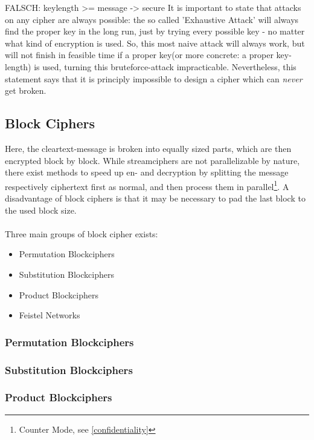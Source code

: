 FALSCH: keylength >= message -> secure
It is important to state that attacks on any cipher are always possible: the so called
'Exhaustive Attack' will always find the proper key in the long run, just by trying every
possible key - no matter what kind of encryption is used. So, this most naive attack will always work, but
will not finish in feasible time if a proper key(or more concrete: a proper key-length) is used, turning this bruteforce-attack
impracticable. Nevertheless, this statement says that it is principly impossible to design
a cipher which can \textit{never} get broken.

\subsection{Block Ciphers}

Here, the cleartext-message is broken into equally sized parts, which are then encrypted block by block. While streamciphers are not parallelizable
by nature, there exist methods to speed up en- and decryption by splitting the message respectively ciphertext first as normal, and then process them in
parallel\footnote{Counter Mode, see \ref{confidentiality}}. A disadvantage of block ciphers is that it may be necessary to pad the last block to the used block size. 
\\
\\
Three main groups of block cipher exists:
\begin{itemize}
 \item Permutation Blockciphers
 \item Substitution Blockciphers
 \item Product Blockciphers
 \item Feistel Networks
\end{itemize}

\subsubsection{Permutation Blockciphers}

\subsubsection{Substitution Blockciphers}

\subsubsection{Product Blockciphers}

